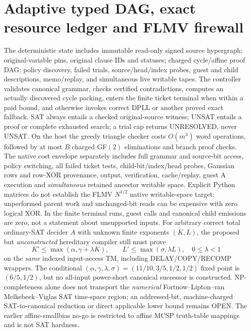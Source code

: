 \documentclass[11pt]{article}
\begin{document}
\section{Adaptive typed DAG, exact resource ledger and FLMV firewall}
The deterministic state includes immutable read-only signed source hypergraph; original-variable pins, original clause IDs and statuses; charged cycle/affine proof DAG; policy discovery, failed trials, source/head/index probes, guest and child descriptions, memo/replay, and simultaneous live writable tapes. The controller validates canonical grammar, checks certified contradictions, computes an actually discovered cycle packing, enters the finite ticket terminal when within a paid bound, and otherwise invokes correct DPLL or another proved exact fallback. SAT always entails a checked original-source witness; UNSAT entails a proof or complete exhausted search; a trial cap returns UNRESOLVED, never UNSAT.
On the host the greedy triangle checker costs $O(m^3)$ word operations, followed by at most $B$ charged GF$(2)$ eliminations and branch proof checks. The native cost envelope separately includes full grammar and source-bit access, policy switching, all failed ticket tests, child-bit/index/head probes, Gaussian rows and row-XOR provenance, output, verification, cache/replay, guest A execution and \emph{simultaneous} retained ancestor writable space. Explicit Python matrices do not establish the FLMV $N^{1/2}$ native writable-space target; unperformed parent work and unchanged-bit reads can be expensive with zero logical XOR. In the finite terminal runs, guest calls and canonical child emissions are zero, not a statement about unsupported inputs.
For arbitrary correct total ordinary-SAT decider $A$ with unknown finite exponents $(K,L)$, the proposed but \emph{unconstructed} hereditary compiler still must prove
\[
K'\le\max(\alpha,\gamma+\lambda K),\qquad L'\le\max(\sigma,\lambda L),\quad 0\le\lambda<1
\]
on the \emph{same} indexed input-access TM, including DELAY/COPY/RECOMP wrappers. The conditional $(\alpha,\gamma,\lambda,\sigma)=(11/10,3/5,1/2,1/2)$ fixed point is $(6/5,1/2)$, but no all-input power-short canonical successor is constructed. NP-completeness alone does not transport the \emph{numerical} Fortnow--Lipton--van Melkebeek--Viglas SAT time-space region; an addressed-bit, machine-charged SAT-to-canonical reduction or direct applicable lower bound remains OPEN. The earlier affine-smallbias no-go is restricted to affine MCSP truth-table mappings and is not SAT hardness.
\end{document}
